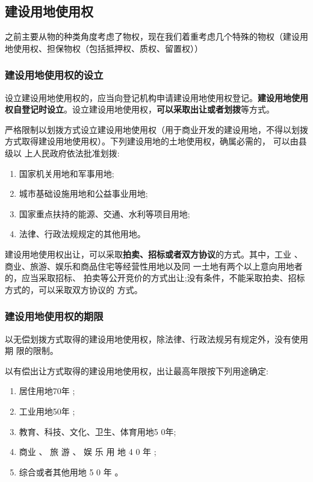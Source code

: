 \documentclass[UTF8,12pt]{ctexart}
\numberwithin{equation}{section} %
\numberwithin{figure}{section}
\numberwithin{table}{section}
\begin{document}
	\subsection{建设用地使用权}
	之前主要从物的种类角度考虑了物权，现在我们着重考虑几个特殊的物权（建设用地使用权、担保物权（包括抵押权、质权、留置权））
	
	\subsubsection{建设用地使用权的设立}
	设立建设用地使用权的，应当向登记机构申请建设用地使用权登记。\textbf{建设用地使用权自登记时设立}。设立建设用地使用权，\textbf{可以采取出让或者划拨}等方式。
	
	严格限制以划拨方式设立建设用地使用权（用于商业开发的建设用地，不得以划拨方式取得建设用地使用权）。下列建设用地的土地使用权，确属必需的， 可以由县级以 上人民政府依法批准划拨:
	\begin{enumerate}
		\item 国家机关用地和军事用地;
		
		\item 城市基础设施用地和公益事业用地; 
		
		\item 国家重点扶持的能源、交通、水利等项目用地;
		
		\item 法律、行政法规规定的其他用地。
	\end{enumerate}
	
	建设用地使用权出让，可以采取\textbf{拍卖、招标或者双方协议}的方式。其中，工业 、商业、旅游、娱乐和商品住宅等经营性用地以及同 一土地有两个以上意向用地者的，应当采取招标、 拍卖等公开竞价的方式出让;没有条件，不能采取拍卖、招标方式的，可以采取双方协议的 方式。
	
	\subsubsection{建设用地使用权的期限}
	以无偿划拨方式取得的建设用地使用权，除法律、行政法规另有规定外，没有使用期 限的限制。
	
	以有偿出让方式取得的建设用地使用权，出让最高年限按下列用途确定:
	\begin{enumerate}
		\item 居住用地70年 ;
		
		\item 工业用地50年 ;
		
		\item 教育、科技、文化、卫生、体育用地5 0年;
		
		\item 商业 、 旅 游 、 娱 乐 用 地 4 0 年 ;
		
		\item 综合或者其他用地 5 0 年 。
	\end{enumerate}
\end{document}
